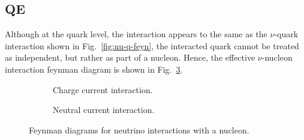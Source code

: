   \subsection{QE}
  Although at the quark level, the interaction appears to the same as the $\nu$-quark interaction shown in Fig.~\ref{fig:nu-q-feyn}, the interacted quark cannot be treated as independent, but rather as part of a nucleon.
  Hence, the effective $\nu$-nucleon interaction feynman diagram is shown in Fig.~\ref{fig:nu-n-feyn}.
  \begin{figure}[h]
    \centering
    \begin{subfigure}[b]{0.45\textwidth}
      \centering
      \caption{Charge current interaction.}
      \label{fig:cc-interaction-n}
    \end{subfigure}
    \hfill
    \begin{subfigure}[b]{0.45\textwidth}
      \centering
      \caption{Neutral current interaction.}
      \label{fig:nc-interaction-n}
    \end{subfigure}
    \caption{Feynman diagrams for neutrino interactions with a nucleon.}
    \label{fig:nu-n-feyn}
  \end{figure}
